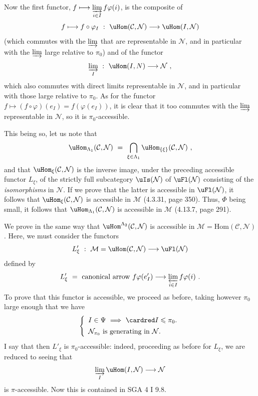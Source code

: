 Now the first functor, $f \longmapsto \varinjlim\limits_{i\in I} f\varphi(i)$, is the composite of
\[
f \longmapsto f\circ\varphi_I \ : \ \uHom(\mathcal{C},\mathcal{N}) \longrightarrow \uHom(I,\mathcal{N})
\]
(which commutes with the $\varinjlim$ that are representable in $\mathcal{N}$, and in particular with the $\varinjlim$ large relative to $\pi_0$) and of the functor
\[
\varinjlim_{I} \ : \ \uHom(I,N) \longrightarrow \mathcal{N} \ , %
\]
which also commutes with direct limits representable in $\mathcal{N}$, and in particular with those large relative to $\pi_0$. As for the functor $f \longmapsto (f\circ\varphi)(e_I) = f(\varphi(e_I))$, it is clear that it too commutes with the $\varinjlim$ representable in $\mathcal{N}$, so it is $\pi_0$-accessible.


This being so, let us note that
\[
\uHom_{\Lambda_1}(\mathcal{C},\mathcal{N}) \ = \ \bigcap_{\xi\in\Lambda_1} \uHom_{\{\xi\}}(\mathcal{C},\mathcal{N}) \ ,
\]
and that $\uHom_\xi(\mathcal{C},\mathcal{N})$ is the inverse image, under the preceding accessible functor $L_\xi$, of the strictly full subcategory $\uIs(\mathcal{N})$ of $\uFl(\mathcal{N})$ consisting of the \textit{isomorphisms} in $\mathcal{N}$. If we prove that the latter is accessible in $\uFl(\mathcal{N})$, it follows that
$\uHom_\xi(\mathcal{C},\mathcal{N})$ is accessible in $\mathcal{M}$ (4.3.31, page 350). Thus, $\Phi$ being small, it follows that $\uHom_{\Lambda_1}(\mathcal{C},\mathcal{N})$ is accessible in $\mathcal{M}$ (4.13.7, page 291).

We prove in the same way that $\uHom^{\Lambda_2}(\mathcal{C},\mathcal{N})$ is accessible in $\mathcal{M} = \mathrm{Hom}(\mathcal{C},\mathcal{N})$. Here, we must consider the functors %
\[
L'_\xi \ : \ \mathcal{M} = \uHom(\mathcal{C},\mathcal{N}) \longrightarrow \uFl(\mathcal{N})
\]
defined by
\[
L'_\xi \ = \ \text{canonical arrow } f\varphi(e'_I) \longrightarrow \varprojlim_{i\in I} f\varphi(i) \ .
\]
To prove that this functor is accessible, we proceed as before, taking however $\pi_0$ large enough that we have
\[
\left\{
\begin{array}{l}
I \in \Psi \ \Longrightarrow \ \cardred I \leqslant \pi_0. \\[1ex]
\mathcal{N}_{\pi_0} \text{ is generating in } \mathcal{N}.
\end{array}
\right.
\]
I say that then $L'_\xi$ is $\pi_0$-accessible: indeed, proceeding as before for $L_\xi$, we are reduced to seeing that
\[
\varinjlim_{I} \uHom(I,\mathcal{N}) \longrightarrow \mathcal{N}
\]
is $\pi$-accessible. Now this is contained in SGA 4 I 9.8.

